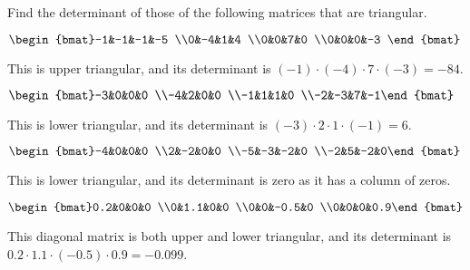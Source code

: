 \begin{example} 
Find the determinant of those of the following matrices that are triangular.
\begin{Parts}
\item \(\begin{bmat}-1&-1&-1&-5
\\0&-4&1&4
\\0&0&7&0
\\0&0&0&-3 \end{bmat}\)
\begin{solution} 
This is upper triangular, and its determinant is \((-1)\cdot(-4)\cdot7\cdot(-3)=-84\). 
\end{solution}

\item \(\begin{bmat}-3&0&0&0
\\-4&2&0&0
\\-1&1&1&0
\\-2&-3&7&-1\end{bmat}\)
\begin{solution} 
This is lower triangular, and its determinant is \((-3)\cdot2\cdot1\cdot(-1)=6\). 
\end{solution}

\begin{OmitV1}
\item \(\begin{bmat}-4&0&0&0
\\2&-2&0&0
\\-5&-3&-2&0
\\-2&5&-2&0\end{bmat}\)
\begin{solution} 
This is lower triangular, and its determinant is zero as it has a column of zeros. 
\end{solution}

\item \(\begin{bmat}0.2&0&0&0
\\0&1.1&0&0
\\0&0&-0.5&0
\\0&0&0&0.9\end{bmat}\)
\begin{solution} 
This diagonal matrix is both upper and lower triangular, and its determinant is \(0.2\cdot1.1\cdot(-0.5)\cdot0.9=-0.099\). 
\end{solution}
\end{OmitV1}


\end{Parts}
\end{example}

